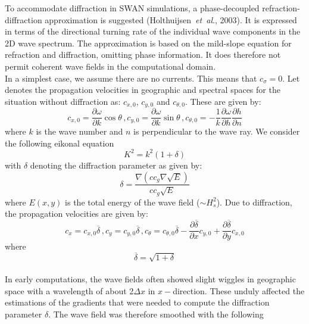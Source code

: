 \documentclass[12pt]{book}
\begin{document}
To accommodate diffraction in SWAN simulations, a phase-decoupled refraction-diffraction approximation
is suggested (Holthuijsen~{\it et~al}., 2003). It is expressed in terms of the directional turning rate
of the individual wave components in the 2D wave spectrum. The approximation is based on the mild-slope
equation for refraction and diffraction, omitting phase information. It does therefore not permit coherent
wave fields in the computational domain.
\\[2ex]
\noindent
In a simplest case, we assume there are no currents. This means that $c_\sigma = 0$. Let denotes the
propagation velocities in geographic and spectral spaces for the situation without diffraction as:
$c_{x,0}$, $c_{y,0}$ and $c_{\theta,0}$. These are given by:
\begin{equation}
  c_{x,0} = \frac{\partial \omega}{\partial k} \cos\theta\,,
  c_{y,0} = \frac{\partial \omega}{\partial k} \sin\theta\,,
  c_{\theta,0} = -\frac{1}{k}\frac{\partial \omega}{\partial h} \frac{\partial h}{\partial n}
  \label{eq3-42}
\end{equation}
where $k$ is the wave number and $n$ is perpendicular to the wave ray. We consider the following eikonal
equation
\begin{equation}
  K^2 = k^2 (1+\delta)
  \label{eq3-43}
\end{equation}
with $\delta$ denoting the diffraction parameter as given by:
\begin{equation}
  \delta = \frac{\nabla (c c_g \nabla \sqrt{E})}{c c_g \sqrt{E}}
  \label{eq3-44}
\end{equation}
where $E(x,y)$ is the total energy of the wave field ($\sim H^2_s$).
Due to diffraction, the propagation velocities are given by:
\begin{equation}
  c_x = c_{x,0} \overline{\delta}\,,
  c_y = c_{y,0} \overline{\delta}\,,
  c_\theta = c_{\theta,0} \overline{\delta} - \frac{\partial \overline{\delta}}{\partial x}
   c_{y,0} + \frac{\partial \overline{\delta}}{\partial y}c_{x,0}
  \label{eq3-45}
\end{equation}
where
\begin{equation}
  \overline{\delta} = \sqrt{1+\delta}
  \label{eq3-46}
\end{equation}
\\[2ex]
\noindent
In early computations, the wave fields often showed slight wiggles in geographic space with a wavelength
of about 2$\Delta x$ in $x-$direction. These unduly affected the estimations of the gradients that were
needed to compute the diffraction parameter $\delta$. The wave field was therefore smoothed with the following
\end{document}
